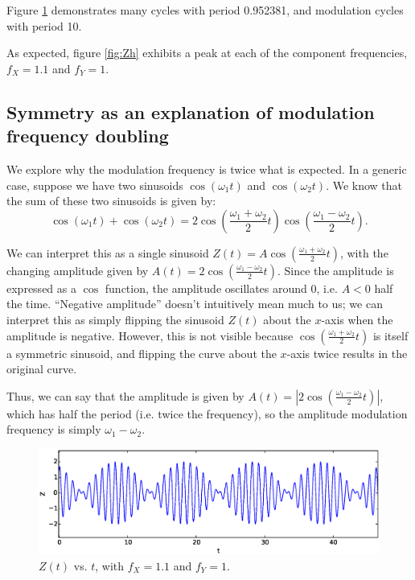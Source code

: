 \documentclass{article}
\theoremstyle{definition}
\renewcommand{\>}{\rangle}
\newcommand{\<}{\langle}
\begin{document}
Figure \ref{fig:Z} demonstrates many cycles with period 0.952381,
and modulation cycles with period 10.

As expected,
figure \ref{fig:Zh} exhibits a peak at each of the
component frequencies, $f_X = 1.1$ and $f_Y=1$.

\subsection{Symmetry as an explanation of modulation frequency doubling}

We explore why the modulation frequency is twice what is expected. In a generic case,
suppose we have two sinusoids $\cos(\omega_1 t)$ and $\cos(\omega_2 t)$. We know that
the sum of these two sinusoids is given by:
$$\cos(\omega_1 t) + \cos(\omega_2 t) = 2\cos\left(\frac{\omega_1 + \omega_2}{2}t\right)
\cos\left(\frac{\omega_1 - \omega_2}{2}t\right).$$

We can interpret this as a single sinusoid $Z(t) = A\cos\left(\frac{\omega_1 + \omega_2}{2}t\right)$,
with the changing amplitude given by $A(t) = 2\cos\left(\frac{\omega_1 - \omega_2}{2}t\right)$.
Since the amplitude is expressed as a $\cos$ function, the amplitude oscillates around 0, i.e.
$A<0$ half the time. ``Negative amplitude'' doesn't intuitively mean much to us; we can interpret
this as simply flipping the sinusoid $Z(t)$ about the $x$-axis when the amplitude is negative.
However, this is not visible because $\cos\left(\frac{\omega_1 + \omega_2}{2}t\right)$ is itself a
symmetric sinusoid, and flipping the curve about the $x$-axis twice
results in the original curve.

Thus, we can say that the amplitude
is given by $A(t) = \left| 2\cos\left(\frac{\omega_1 - \omega_2}{2}t\right) \right|$, which has half
the period (i.e. twice the frequency), so the amplitude modulation frequency is simply $\omega_1 - \omega_2$.

\begin{figure}\centering
\includegraphics[width=\textwidth]{Z.eps}
\caption{$Z(t)$ vs. $t$, with $f_X = 1.1$ and $f_Y = 1$.}\label{fig:Z}
\end{figure}
\end{document}
